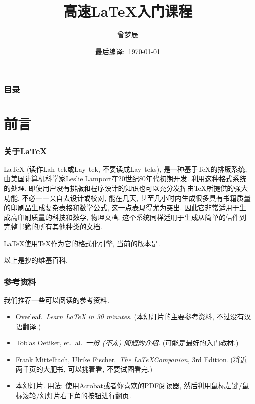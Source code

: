 \documentclass{beamer}
\title{高速\LaTeX{}入门课程}
\author{曾梦辰}
\institute{北京师范大学OM学社}
\date{最后编译:\ \today}
\begin{document}
\maketitle

\begin{frame}
    \frametitle{目录}
    \tableofcontents
\end{frame}

\section{前言}

\begin{frame}
    \frametitle{关于\LaTeX{}}
    LaTeX (读作Lah--tek或Lay--tek, 不要读成Lay--teks), 是一种基于TeX的排版系统, 由美国计算机科学家Leslie Lamport在20世纪80年代初期开发.
    利用这种格式系统的处理, 即使用户没有排版和程序设计的知识也可以充分发挥由TeX所提供的强大功能, 不必一一亲自去设计或校对, 能在几天, 甚至几小时内生成很多具有书籍质量的印刷品生成复杂表格和数学公式, 这一点表现得尤为突出.
    因此它非常适用于生成高印刷质量的科技和数学, 物理文档.
    这个系统同样适用于生成从简单的信件到完整书籍的所有其他种类的文档.

    LaTeX使用TeX作为它的格式化引擎, 当前的版本是\LaTeXe.\pause

    \vspace{1cm}
    以上是抄的维基百科.
\end{frame}

\begin{frame}
    \frametitle{参考资料}
    我们推荐一些可以阅读的参考资料.\pause
    \begin{itemize}
        \item<2-> Overleaf.\ \emph{Learn LaTeX in 30 minutes}.
        (本幻灯片的主要参考资料, 不过没有汉语翻译.)
        \item<3-> Tobias Oetiker, et.~al.\ \emph{一份 (不太) 简短的\LaTeXe{}介绍}.
        (可能是最好的入门教材.)
        \item<4-> Frank Mittelbach, Ulrike Fischer.\ \emph{The \LaTeX Companion}, 3rd Edition.
        (将近两千页的大肥书, 可以挑着看, 不要试图看完.)
        \item<5-> 本幻灯片. 用法: 使用Acrobat或者你喜欢的PDF阅读器, 然后利用鼠标左键/鼠标滚轮/幻灯片右下角的按钮进行翻页.
    \end{itemize}
\end{frame}
\end{document}
